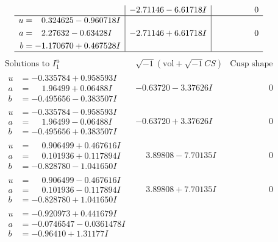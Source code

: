 \documentclass[1p]{elsarticle_modified}
\theoremstyle{definition}
\newcommand{\I}{\sqrt{-1}}
\begin{document}
$$\begin{array}{c|c|c}
 & -2.71146 - 6.61718 I & \phantom{-0.000000 } 0 \\ \hline\begin{aligned}
u &= \phantom{-}0.324625 - 0.960718 I \\
a &= \phantom{-}2.27632 - 0.63428 I \\
b &= -1.170670 + 0.467528 I\end{aligned}
 & -2.71146 + 6.61718 I & \phantom{-0.000000 } 0\\
 \hline 
 \end{array}$$\newpage$$\begin{array}{c|c|c}  
\text{Solutions to }I^u_{1}& \I (\text{vol} + \sqrt{-1}CS) & \text{Cusp shape}\\
 \hline 
\begin{aligned}
u &= -0.335784 + 0.958593 I \\
a &= \phantom{-}1.96499 + 0.06488 I \\
b &= -0.495656 - 0.383507 I\end{aligned}
 & -0.63720 - 3.37626 I & \phantom{-0.000000 } 0 \\ \hline\begin{aligned}
u &= -0.335784 - 0.958593 I \\
a &= \phantom{-}1.96499 - 0.06488 I \\
b &= -0.495656 + 0.383507 I\end{aligned}
 & -0.63720 + 3.37626 I & \phantom{-0.000000 } 0 \\ \hline\begin{aligned}
u &= \phantom{-}0.906499 + 0.467616 I \\
a &= \phantom{-}0.101936 + 0.117894 I \\
b &= -0.828780 - 1.041650 I\end{aligned}
 & \phantom{-}3.89808 - 7.70135 I & \phantom{-0.000000 } 0 \\ \hline\begin{aligned}
u &= \phantom{-}0.906499 - 0.467616 I \\
a &= \phantom{-}0.101936 - 0.117894 I \\
b &= -0.828780 + 1.041650 I\end{aligned}
 & \phantom{-}3.89808 + 7.70135 I & \phantom{-0.000000 } 0 \\ \hline\begin{aligned}
u &= -0.920973 + 0.441679 I \\
a &= -0.0746547 - 0.0361478 I \\
b &= -0.96410 + 1.31177 I\end{aligned}

\end{array}$$
\end{document}
